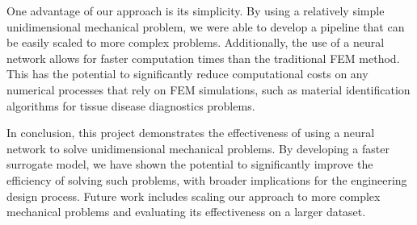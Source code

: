 \documentclass[11pt]{scrartcl} %
\begin{document}
One advantage of our approach is its simplicity. By using a relatively simple unidimensional mechanical problem, we were able to develop a pipeline that can be easily scaled to more complex problems. Additionally, the use of a neural network allows for faster computation times than the traditional FEM method. This has the potential to significantly reduce computational costs on any numerical processes that rely on FEM simulations, such as material identification algorithms for tissue disease diagnostics problems.

In conclusion, this project demonstrates the effectiveness of using a neural network to solve unidimensional mechanical problems. By developing a faster surrogate model, we have shown the potential to significantly improve the efficiency of solving such problems, with broader implications for the engineering design process. Future work includes scaling our approach to more complex mechanical problems and evaluating its effectiveness on a larger dataset.
\end{document}
